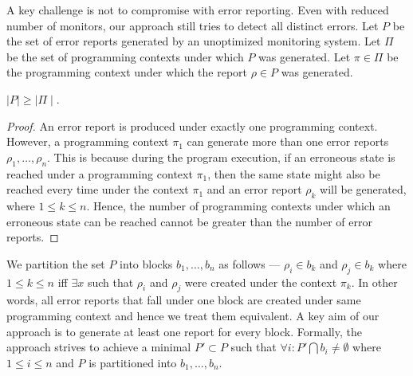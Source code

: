 A key challenge is not to compromise with error reporting. Even with reduced 
number of monitors, our approach still tries to detect all distinct errors. Let 
$P$ be the set of error reports generated by an unoptimized monitoring system. 
Let $\Pi$ be the set of programming contexts under which $P$ was generated. Let 
$\pi \in \Pi$ be the programming context under which the report $\rho \in P$ was 
generated.

\begin{theorem}
$\mid P\mid \ge \mid \Pi \mid$.
\end{theorem}

\begin{proof}
An error report is produced under exactly one programming context. However, a 
programming context $\pi_1$ can generate more than one error reports $\rho_1, 
\ldots ,\rho_n$. This is because during the program execution, if an erroneous 
state is reached under a programming context $\pi_1$, then the same state might 
also be reached every time under the context $\pi_1$ and an error report 
$\rho_k$ will be generated, where $1 \le k \le n$. Hence, the number of 
programming contexts under which an erroneous state can be reached cannot be 
greater than the number of error reports.
\end{proof}

We partition the set $P$ into blocks $b_1, \ldots , b_n$ as follows --- $\rho_i 
\in b_k$ and $\rho_j \in b_k$ where  $1 \le k \le n$ iff $\exists x$  such that $\rho_i$ and $\rho_j$ were created under the context $\pi_k$. 
In other words, all error reports that fall under one block are created under 
same programming context and hence we treat them equivalent. A key aim of our 
approach is to generate at least one report for every block.  Formally, the approach strives to achieve a minimal $P' 
\subset P$ such that $\forall i : P' \bigcap b_i \ne \emptyset$ where $1 \le i 
\le n$ and $P$ is partitioned into $b_1, \ldots, b_n$.

